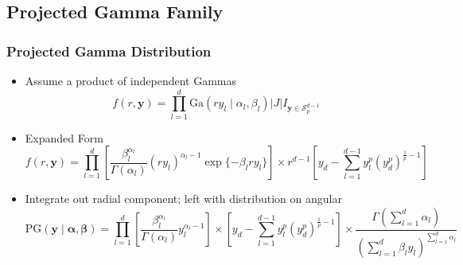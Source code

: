 \documentclass[aspectratio=169]{beamer}
\begin{document}
\subsection{Projected Gamma Family}

\begin{frame}
  \frametitle{Projected Gamma Distribution}
  \begin{itemize}
    \item Assume a product of independent Gammas
      \begin{equation*}
        f(r,\bm{y}) = \prod_{l = 1}^d \text{Ga}\left(ry_l\mid\alpha_l,\beta_l\right)
        \lvert J \rvert I_{\bm{y} \in \mathcal{S}_{p}^{d-1}}
      \end{equation*}
    \pause
    \item Expanded Form
      \begin{equation*}
        f(r,\bm{ y}) = \prod_{l = 1}^{d}
        \left[\frac{\beta_l^{\alpha_l}}{\Gamma(\alpha_l)}(ry_l)^{\alpha_l - 1}
                    \exp\lbrace-\beta_lry_l\rbrace\right]
        \times r^{d-1}\left[y_d - {\textstyle \sum}_{l = 1}^{d-1}y_l^p
                  \left(y_d^p\right)^{\frac{1}{p} - 1}\right]
      \end{equation*}
    \pause
    \item Integrate out radial component; left with distribution on angular
      \begin{equation*}
        \text{PG}(\bm{ y}\mid\bm{ \alpha},\bm{ \beta}) = \prod_{l = 1}^d\left[\frac{\beta_l^{\alpha_l}}{\Gamma(\alpha_l)}y_l^{\alpha_l - 1}\right]
          \times \left[y_d - {\textstyle \sum}_{l = 1}^{d-1}y_l^p\left(y_d^p\right)^{\frac{1}{p} - 1}\right]
          \times \frac{\Gamma({\textstyle\sum}_{l = 1}^d\alpha_l)}{\left({\textstyle\sum}_{l = 1}^d \beta_ly_l\right)^{{\scriptstyle\sum_{l = 1}^d \alpha_l}}}
      \end{equation*}
  \end{itemize}
\end{frame}
\end{document}

